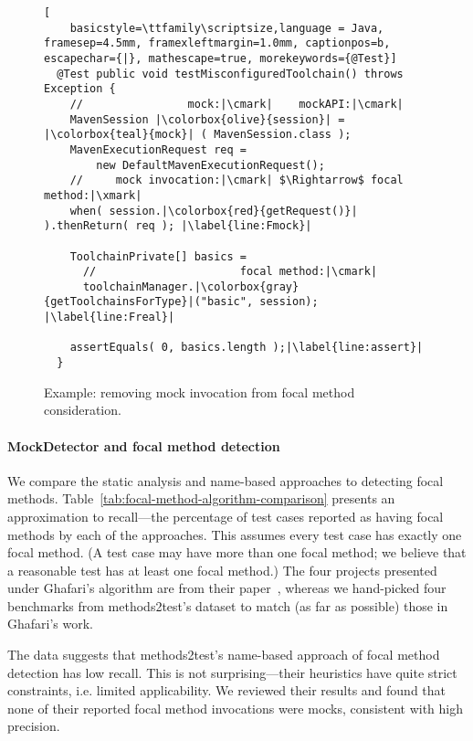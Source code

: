 \begin{figure}[h]
	\begin{lstlisting}[
	basicstyle=\ttfamily\scriptsize,language = Java, framesep=4.5mm, framexleftmargin=1.0mm, captionpos=b, escapechar={|}, mathescape=true, morekeywords={@Test}]
  @Test public void testMisconfiguredToolchain() throws Exception {
    //                mock:|\cmark|    mockAPI:|\cmark|
    MavenSession |\colorbox{olive}{session}| = |\colorbox{teal}{mock}| ( MavenSession.class );
    MavenExecutionRequest req =
        new DefaultMavenExecutionRequest();
    //     mock invocation:|\cmark| $\Rightarrow$ focal method:|\xmark|
    when( session.|\colorbox{red}{getRequest()}| ).thenReturn( req ); |\label{line:Fmock}|

    ToolchainPrivate[] basics =
      //                      focal method:|\cmark|
      toolchainManager.|\colorbox{gray}{getToolchainsForType}|("basic", session); |\label{line:Freal}|

    assertEquals( 0, basics.length );|\label{line:assert}|
  }
  \end{lstlisting}

  \caption{Example: removing mock invocation from focal method consideration.}
  \label{fig:mockExampleEvaluation}
\end{figure}

\paragraph{MockDetector and focal method detection}
We compare the static analysis and name-based approaches to detecting focal methods. Table~\ref{tab:focal-method-algorithm-comparison} presents an approximation to recall---the percentage of test cases reported as having focal methods by each of the approaches. This assumes every test case has exactly one focal method. (A test case may have more than one focal method; we believe that a reasonable test has at least one focal method.) The four projects presented under Ghafari's algorithm are from their paper~\cite{ghafari15:_autom}, whereas we hand-picked four benchmarks from methods2test's dataset to match (as far as possible) those in Ghafari's work.

The data suggests that methods2test's name-based approach of focal method detection has low recall. This is not surprising---their heuristics have quite strict constraints, i.e. limited applicability. We reviewed their results and found that none of their reported focal method invocations were mocks, consistent with high precision.

